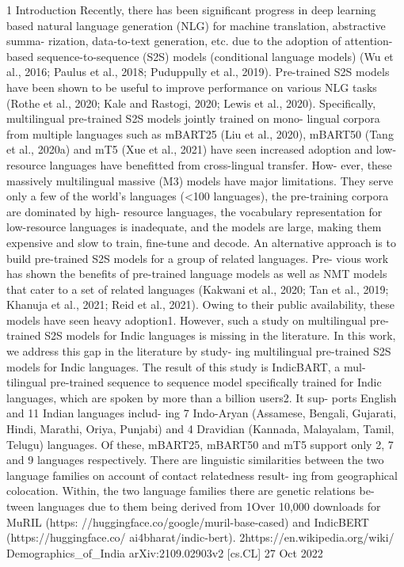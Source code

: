 \documentclass[11pt,a4paper]{article}
\begin{document}
1 Introduction Recently, there has been signiﬁcant progress in deep learning based natural language generation (NLG) for machine translation, abstractive summa- rization, data-to-text generation, etc. due to the adoption of attention-based sequence-to-sequence (S2S) models (conditional language models) (Wu et al., 2016; Paulus et al., 2018; Puduppully et al., 2019). Pre-trained S2S models have been shown to be useful to improve performance on various NLG tasks (Rothe et al., 2020; Kale and Rastogi, 2020; Lewis et al., 2020). Speciﬁcally, multilingual pre-trained S2S models jointly trained on mono- lingual corpora from multiple languages such as mBART25 (Liu et al., 2020), mBART50 (Tang et al., 2020a) and mT5 (Xue et al., 2021) have seen increased adoption and low-resource languages have beneﬁtted from cross-lingual transfer. How- ever, these massively multilingual massive (M3) models have major limitations. They serve only a few of the world’s languages (<100 languages), the pre-training corpora are dominated by high- resource languages, the vocabulary representation for low-resource languages is inadequate, and the models are large, making them expensive and slow to train, ﬁne-tune and decode. An alternative approach is to build pre-trained S2S models for a group of related languages. Pre- vious work has shown the beneﬁts of pre-trained language models as well as NMT models that cater to a set of related languages (Kakwani et al., 2020; Tan et al., 2019; Khanuja et al., 2021; Reid et al., 2021). Owing to their public availability, these models have seen heavy adoption1. However, such a study on multilingual pre-trained S2S models for Indic languages is missing in the literature. In this work, we address this gap in the literature by study- ing multilingual pre-trained S2S models for Indic languages. The result of this study is IndicBART, a mul- tilingual pre-trained sequence to sequence model speciﬁcally trained for Indic languages, which are spoken by more than a billion users2. It sup- ports English and 11 Indian languages includ- ing 7 Indo-Aryan (Assamese, Bengali, Gujarati, Hindi, Marathi, Oriya, Punjabi) and 4 Dravidian (Kannada, Malayalam, Tamil, Telugu) languages. Of these, mBART25, mBART50 and mT5 support only 2, 7 and 9 languages respectively. There are linguistic similarities between the two language families on account of contact relatedness result- ing from geographical colocation. Within, the two language families there are genetic relations be- tween languages due to them being derived from 1Over 10,000 downloads for MuRIL (https: //huggingface.co/google/muril-base-cased) and IndicBERT (https://huggingface.co/ ai4bharat/indic-bert). 2https://en.wikipedia.org/wiki/ Demographics_of_India arXiv:2109.02903v2 [cs.CL] 27 Oct 2022
\end{document}
